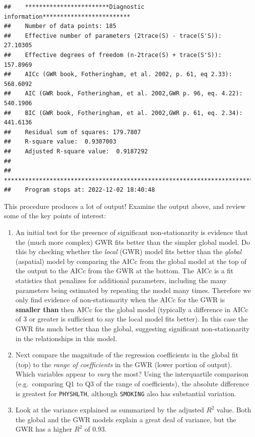 \documentclass[
]{book}
\providecommand{\tightlist}{%
  \setlength{\itemsep}{0pt}\setlength{\parskip}{0pt}}
\begin{document}
\begin{verbatim}
##    ************************Diagnostic information*************************
##    Number of data points: 185 
##    Effective number of parameters (2trace(S) - trace(S'S)): 27.10305 
##    Effective degrees of freedom (n-2trace(S) + trace(S'S)): 157.8969 
##    AICc (GWR book, Fotheringham, et al. 2002, p. 61, eq 2.33): 568.6092 
##    AIC (GWR book, Fotheringham, et al. 2002,GWR p. 96, eq. 4.22): 540.1906 
##    BIC (GWR book, Fotheringham, et al. 2002,GWR p. 61, eq. 2.34): 441.6136 
##    Residual sum of squares: 179.7807 
##    R-square value:  0.9307003 
##    Adjusted R-square value:  0.9187292 
## 
##    ***********************************************************************
##    Program stops at: 2022-12-02 18:40:48
\end{verbatim}

This procedure produces a lot of output! Examine the output above, and review some of the key points of interest:

\begin{enumerate}
\def\labelenumi{\arabic{enumi}.}
\tightlist
\item
  An initial test for the presence of significant non-stationarity is evidence that the (much more complex) GWR fits better than the simpler global model. Do this by checking whether the \emph{local} (GWR) model fits better than the \emph{global} (aspatial) model by comparing the AICc from the global model at the top of the output to the AICc from the GWR at the bottom. The AICc is a fit statistics that penalizes for additional parameters, including the many parameters being estimated by repeating the model many times. Therefore we only find evidence of non-stationarity when the AICc for the GWR is \textbf{smaller than} then AICc for the global model (typically a difference in AICc of 3 or greater is sufficient to say the local model fits better). In this case the GWR fits much better than the global, suggesting significant non-stationarity in the relationships in this model.
\item
  Next compare the magnitude of the regression coefficients in the global fit (top) to the \emph{range of coefficients} in the GWR (lower portion of output). Which variables appear to \emph{vary} the most? Using the interquartile comparison (e.g.~comparing Q1 to Q3 of the range of coefficients), the absolute difference is greatest for \texttt{PHYSHLTH}, although \texttt{SMOKING} also has substantial variation.
\item
  Look at the variance explained as summarized by the adjusted \(R^2\) value. Both the global and the GWR models explain a great deal of variance, but the GWR has a higher \(R^2\) of 0.93.
\end{enumerate}
\end{document}
